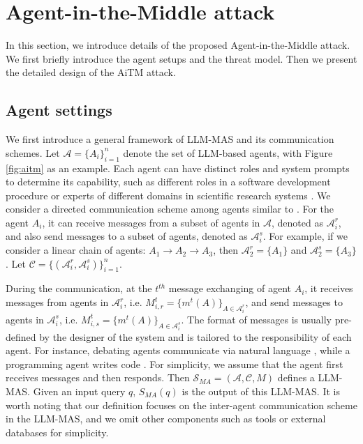 \section{Agent-in-the-Middle attack}
In this section, we introduce details of the proposed Agent-in-the-Middle attack. We first briefly introduce the agent setups and the threat model. Then we present the detailed design of the AiTM attack.


\subsection{Agent settings}
We first introduce a general framework of LLM-MAS and its communication schemes. 
Let $\mathcal{A}=\{A_i\}_{i=1}^n$ denote the set of LLM-based agents, with Figure \ref{fig:aitm} as an example. Each agent can have distinct roles and system prompts to determine its capability, such as different roles in a software development procedure \citep{qian2024chatdev, hong2023metagpt} or experts of different domains in scientific research systems \citep{du2023improving}. We consider a directed communication scheme among agents similar to \cite{yu2024netsafe}. For the agent $A_i$, it can receive messages from a subset of agents in $\mathcal{A}$, denoted as $\mathcal{A}^r_i$, and also send messages to a subset of agents, denoted as $\mathcal{A}^s_i$. For example, if we consider a linear chain of agents: $A_1\rightarrow A_2\rightarrow A_3$, then $\mathcal{A}^r_2=\{A_1\}$ and $\mathcal{A}^s_2=\{A_3\}$. Let $\mathcal{C}=\{(\mathcal{A}^r_i, \mathcal{A}^s_i)\}_{i=1}^n$. 

During the communication, at the $t^{th}$ message exchanging of agent $A_i$, it receives messages from agents in $\mathcal{A}^r_i$, i.e. $M^t_{i,r}=\{m^t(A)\}_{A\in \mathcal{A}^r_i}$, and send messages to agents in $\mathcal{A}^s_i$, i.e. $M^t_{i,s}=\{m^t(A)\}_{A\in \mathcal{A}^s_i}$. The format of messages is usually pre-defined by the designer of the system and is tailored to the responsibility of each agent. For instance, debating agents communicate via natural language \citep{du2023improving, chan2023chateval}, while a programming agent writes code \citep{hong2023metagpt}. For simplicity, we assume that the agent first receives messages and then responds. Then $\mathcal{S}_{MA}=(\mathcal{A},\mathcal{C}, M)$ defines a LLM-MAS. Given an input query $q$, $S_{MA}(q)$ is the output of this LLM-MAS. It is worth noting that our definition focuses on the inter-agent communication scheme in the LLM-MAS, and we omit other components such as tools or external databases for simplicity.


